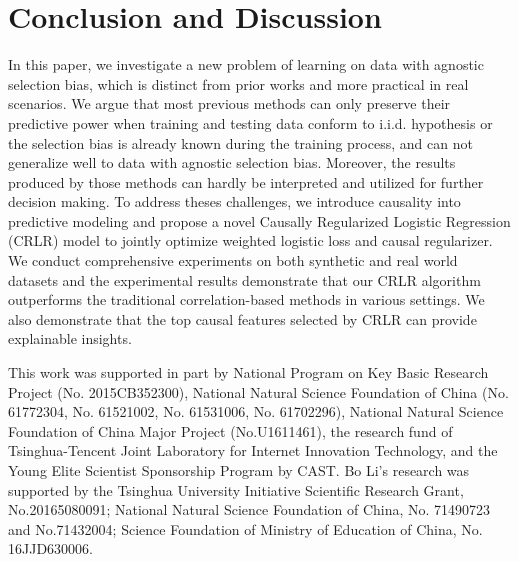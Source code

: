 \documentclass[sigconf]{acmart}
\begin{document}
\section{Conclusion and Discussion}
In this paper, we investigate a new problem of learning on data with agnostic selection bias, which is distinct from prior works and more practical in real scenarios.
We argue that most previous methods can only preserve their predictive power when training and testing data conform to i.i.d. hypothesis or the selection bias is already known during the training process, and can not generalize well to data with agnostic selection bias.
Moreover, the results produced by those methods can hardly be interpreted and utilized for further decision making.
To address theses challenges, we introduce causality into predictive modeling and propose a novel Causally Regularized Logistic Regression (CRLR) model to jointly optimize weighted logistic loss and causal regularizer.
We conduct comprehensive experiments on both synthetic and real world datasets and the experimental results demonstrate that our CRLR algorithm outperforms the traditional correlation-based methods in various settings.
We also demonstrate that the top causal features selected by CRLR can provide explainable insights.

\begin{acks}
This work was supported in part by National Program on Key Basic Research Project (No. 2015CB352300), National Natural Science Foundation of China (No. 61772304, No. 61521002, No. 61531006, No. 61702296), National Natural Science Foundation of China Major Project (No.U1611461), the research fund of Tsinghua-Tencent Joint Laboratory for Internet Innovation Technology, and the Young Elite Scientist Sponsorship Program by CAST.
Bo Li's research was supported by the Tsinghua University Initiative Scientific Research Grant, No.20165080091; National Natural Science Foundation of China, No. 71490723 and No.71432004; Science Foundation of Ministry of Education of China, No. 16JJD630006.
\end{acks}


\balance

\end{document}
